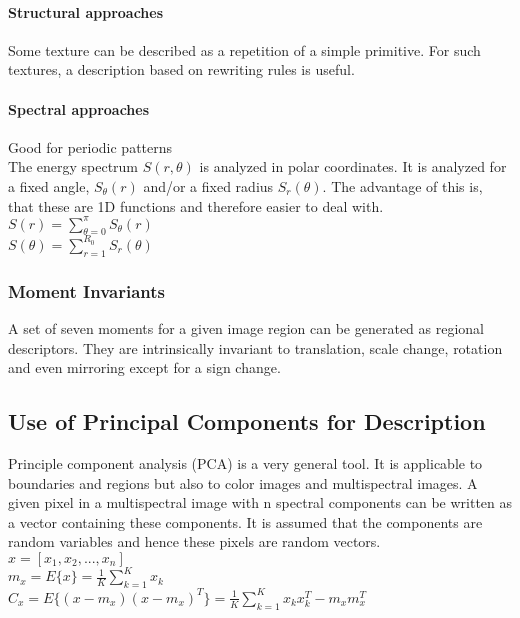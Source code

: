 \paragraph{Structural approaches}
Some texture can be described as a repetition of a simple primitive. For such textures, a description based on rewriting rules is useful.
\paragraph{Spectral approaches}
Good for periodic patterns\\
The energy spectrum $S(r,\theta)$ is analyzed in polar coordinates. It is analyzed for a fixed angle, $S_\theta(r)$ and/or a fixed radius $S_r(\theta)$. The advantage of this is, that these are 1D functions and therefore easier to deal with.\\
$S(r)=\sum\limits_{\theta = 0}^{\pi}S_\theta(r)$\\
$S(\theta)=\sum\limits_{r=1}^{R_0}S_r(\theta)$\\
\subsubsection{Moment Invariants}
A set of seven moments for a given image region can be generated as regional descriptors. They are intrinsically invariant to translation, scale change, rotation and even mirroring except for a sign change.\\
\subsection{Use of Principal Components for Description}
Principle component analysis (PCA) is a very general tool. It is applicable to boundaries and regions but also to color images and multispectral images. A given pixel in a multispectral image with n spectral components can be written as a vector containing these components. It is assumed that the components are random variables and hence these pixels are random vectors.\\

$x = [x_1, x_2, ..., x_n]$\\ %
$m_x = E\{x\} = \frac{1}{K}\sum\limits_{k=1}^{K}x_k$\\
$C_x = E\{(x-m_x)(x-m_x)^T\}=\frac{1}{K}\sum\limits_{k=1}^{K}x_kx_k^T-m_xm_x^T$\\

